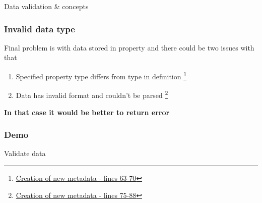 \documentclass{beamer}
\begin{document}
\begin{section}{Data validation \& concepts}
\begin{frame}
\frametitle{Invalid data type}
Final problem is with data stored in property and there could be two issues with that
\begin{enumerate}
	\item Specified property type differs from type in definition \footnote[1]{\href{https://github.com/paqaos/DynamicMetadata-SFI2021/blob/main/MovieDatabase/MovieDatabase/CommandStack/CommandHandlers/MovieMetadatas/CreateMovieMetadataCommandHandler.cs}{Creation of new metadata - lines 63-70}}
	\item Data has invalid format and couldn't be parsed \footnote[2]{\href{https://github.com/paqaos/DynamicMetadata-SFI2021/blob/main/MovieDatabase/MovieDatabase/CommandStack/CommandHandlers/MovieMetadatas/CreateMovieMetadataCommandHandler.cs}{Creation of new metadata - lines 75-88}}
\end{enumerate}
\textbf{In that case it would be better to return error}
\end{frame}

\begin{frame}
\frametitle{Demo}
Validate data
\end{frame}

\end{section}
\end{document}
